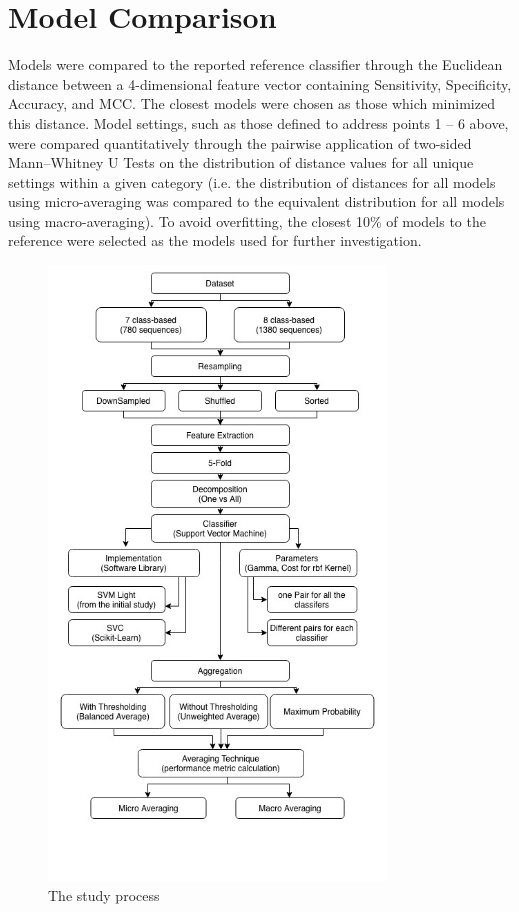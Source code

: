 \section{Model Comparison}
Models were compared to the reported reference classifier through the Euclidean distance between a 4-dimensional
feature vector containing Sensitivity, Specificity, Accuracy, and MCC. The closest models were chosen as those which
minimized this distance. Model settings, such as those defined to address points 1 -- 6 above, were compared
quantitatively through the pairwise application of two-sided Mann–Whitney U Tests on the distribution of distance
values for all unique settings within a given category (i.e. the distribution of distances for all models using
micro-averaging was compared to the equivalent distribution for all models using macro-averaging). To avoid
overfitting, the closest 10\% of models to the reference were selected as the models used for further investigation.

\begin{figure}[ht]
    \centering
    \includegraphics[width=0.80\textwidth]{figures/13studyProcess.jpg}
    \caption{The study process}
    \label{fig:studyProcess}
\end{figure}